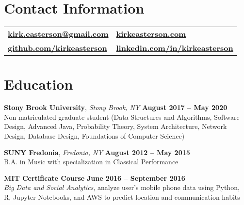 \documentclass[margin,line]{res}
\begin{document}

\begin{resume}
\section{\sc Contact Information}

\vspace{.05in}
\begin{tabular}{@{}p{3.5in}p{3in}}
{\bf \textcolor{blue}{\href{mailto:kirk.easterson@gmail.com}{kirk.easterson@gmail.com}}} &  {\bf \textcolor{blue}{\href{http://www.kirkeasterson.com}{kirkeasterson.com}}}\\
{\bf \textcolor{blue}{\href{https://www.github.com/kirkeasterson}{github.com/kirkeasterson}}} &  {\bf \textcolor{blue}{\href{http://www.linkedin.com/in/kirkeasterson}{linkedin.com/in/kirkeasterson}}}\\
\end{tabular}

\section{\sc Education}
{\bf Stony Brook University}, \textit{Stony Brook, NY} \hfill {\bf August 2017 -- May 2020}\\
Non-matriculated graduate student (Data Structures and Algorithms, Software Design, Advanced Java, Probability Theory, System Architecture, Network Design, Database Design, Foundations of Computer Science)

{\bf SUNY Fredonia}, \textit{Fredonia, NY} \hfill {\bf August 2012 -- May 2015}\\
B.A. in Music with specialization in Classical Performance

{\bf MIT Certificate Course} \hfill {\bf June 2016 -- September 2016}\\
\textit{Big Data and Social Analytics}, analyze user's mobile phone data using Python, R, Jupyter Notebooks, and AWS to predict location and communication habits


\end{resume}
\end{document}
